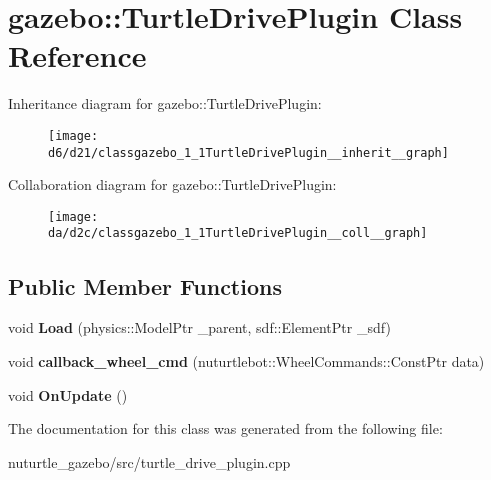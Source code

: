 \hypertarget{classgazebo_1_1TurtleDrivePlugin}{}\section{gazebo\+:\+:Turtle\+Drive\+Plugin Class Reference}
\label{classgazebo_1_1TurtleDrivePlugin}


Inheritance diagram for gazebo\+:\+:Turtle\+Drive\+Plugin\+:
\nopagebreak
\begin{figure}[H]
\begin{center}
\leavevmode
\texttt{[image: d6/d21/classgazebo\_1\_1TurtleDrivePlugin\_\_inherit\_\_graph]}
\end{center}
\end{figure}


Collaboration diagram for gazebo\+:\+:Turtle\+Drive\+Plugin\+:
\nopagebreak
\begin{figure}[H]
\begin{center}
\leavevmode
\texttt{[image: da/d2c/classgazebo\_1\_1TurtleDrivePlugin\_\_coll\_\_graph]}
\end{center}
\end{figure}
\subsection*{Public Member Functions}
\begin{DoxyCompactItemize}
\item 
\mbox{\label{classgazebo_1_1TurtleDrivePlugin_afde78faf88cde0df02bf1c8780777ba7}} 
void {\bfseries Load} (physics\+::\+Model\+Ptr \+\_\+parent, sdf\+::\+Element\+Ptr \+\_\+sdf)
\item 
\mbox{\label{classgazebo_1_1TurtleDrivePlugin_a7eec7e21f3378aed676cc546692c55db}} 
void {\bfseries callback\+\_\+wheel\+\_\+cmd} (nuturtlebot\+::\+Wheel\+Commands\+::\+Const\+Ptr data)
\item 
\mbox{\label{classgazebo_1_1TurtleDrivePlugin_afb0469767e16f4d12e1c854acf43299a}} 
void {\bfseries On\+Update} ()
\end{DoxyCompactItemize}


The documentation for this class was generated from the following file\+:\begin{DoxyCompactItemize}
\item 
nuturtle\+\_\+gazebo/src/turtle\+\_\+drive\+\_\+plugin.\+cpp\end{DoxyCompactItemize}
